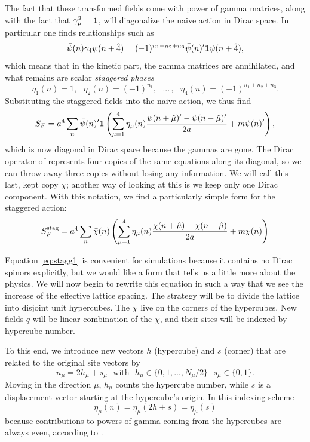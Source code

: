 The fact that these transformed fields come with power of gamma matrices,
along with the fact that $\gamma_\mu^2={\mathbf 1}$, will
diagonalize the naive action in Dirac space. In particular one finds
relationships such as
\begin{equation}
  \bar{\psi}(n)\gamma_4\psi(n+\hat{4})
      =(-1)^{n_1+n_2+n_3}\bar{\psi}(n)'{\mathbf 1}\psi(n+\hat{4}),
\end{equation}
which means that in the kinetic part, the gamma matrices are annihilated,
and what remains are scalar {\it staggered phases}
\begin{equation}
   \eta_1(n)=1, ~~~
   \eta_2(n)=(-1)^{n_1}, ~~~
   ...\,, ~~~
   \eta_4(n)=(-1)^{n_1+n_2+n_3}.
\end{equation}
Substituting the staggered fields
into the naive action, we thus find
\begin{equation}\label{eq:SFdiag}
   S_F
     =a^4\sum_n\bar{\psi}(n)'{\mathbf 1}\left(\sum_{\mu=1}^4\eta_\mu(n)
       \frac{\psi(n+\hat{\mu})'-\psi(n-\hat{\mu})'}{2a}
       +m\psi(n)'\right),
\end{equation}
which is now diagonal in Dirac space because the gammas are gone.
The Dirac operator of  represents four copies of
the same equations along its diagonal, so we can throw away three copies
without losing any information. We will call this last, kept copy $\chi$;
another way of looking at this is we keep only one Dirac component.
With this notation, we find a particularly simple form for the staggered
action:
\begin{equation}\label{eq:stagg1}
  S_F^{\rm stag}
     =a^4\sum_n\bar{\chi}(n)\left(\sum_{\mu=1}^4\eta_\mu(n)
       \frac{\chi(n+\hat{\mu})-\chi(n-\hat{\mu})}{2a}
       +m\chi(n)\right)
\end{equation}

Equation \eqref{eq:stagg1} is convenient for simulations because it contains no
Dirac spinors explicitly, but we would like a form that tells us a little
more about the physics. We will now begin to rewrite this equation in such
a way that we see the increase of the effective lattice spacing. The
strategy will be to divide the lattice into disjoint unit hypercubes.
The $\chi$ live on the corners of the hypercubes. New fields $q$ will be 
linear combination of the $\chi$, and their sites will be indexed by 
hypercube number.

To this end, we introduce new vectors $h$ (hypercube) and $s$ (corner) that
are related to the original site vectors by
\begin{equation}\label{eq:hypercubeIndex}
  n_\mu=2h_\mu+s_\mu~~~\text{with}~~~h_\mu\in\{0, 1, ..., N_\mu/2\}
                    ~~~s_\mu\in\{0,1\}.
\end{equation}
Moving in the direction $\mu$, $h_\mu$ counts the hypercube number,
while $s$ is a displacement vector starting at the hypercube's origin.
In this indexing scheme
\begin{equation}
  \eta_\mu(n)=\eta_\mu(2h+s)=\eta_\mu(s)
\end{equation}
because contributions to powers of gamma coming from the hypercubes are
always even, according to .


